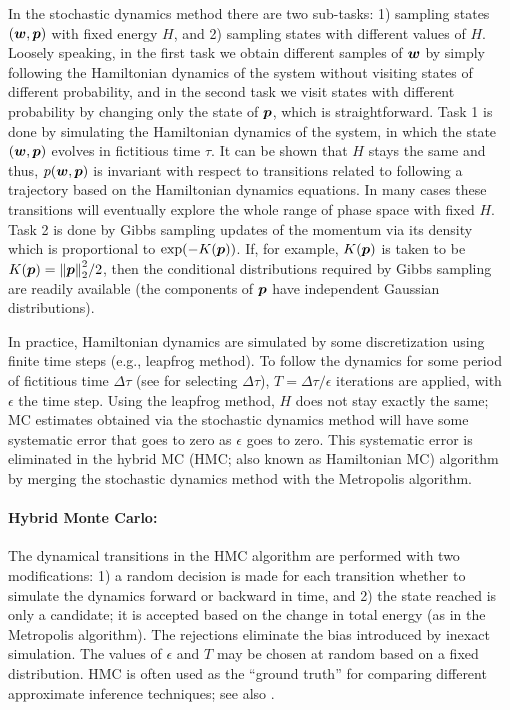In the stochastic dynamics method there are two sub-tasks: 1) sampling states $(\boldsymbol{w},\boldsymbol{p})$ with fixed energy $H$, and 2) sampling states with different values of $H$. 
Loosely speaking, in the first task we obtain different samples of $\boldsymbol{w}$ by simply following the Hamiltonian dynamics of the system without visiting states of different probability, and in the second task we visit states with different probability by changing only the state of $\boldsymbol{p}$, which is straightforward. 
Task 1 is done by simulating the Hamiltonian dynamics of the system, in which the state $(\boldsymbol{w},\boldsymbol{p})$ evolves in fictitious time $\tau$. 
It can be shown that $H$ stays the same and thus, $p(\boldsymbol{w},\boldsymbol{p})$ is invariant with respect to transitions related to following a trajectory based on the Hamiltonian dynamics equations. 
In many cases these transitions will eventually explore the whole range of phase space with fixed $H$.
Task 2 is done by Gibbs sampling updates of the momentum via its density which is proportional to $\exp(-K(\boldsymbol{p}))$. 
If, for example, $K(\boldsymbol{p})$ is taken to be $K(\boldsymbol{p}) = \norm{\boldsymbol{p}}_2^2/2$, then the conditional distributions required by Gibbs sampling are readily available (the components of $\boldsymbol{p}$ have independent Gaussian distributions). 

In practice, Hamiltonian dynamics are simulated by some discretization using finite time steps (e.g., leapfrog method). 
To follow the dynamics for some period of fictitious time $\Delta \tau$ (see \cite{neal1993probabilistic} for selecting $\Delta \tau$), $T = \Delta \tau/\epsilon$ iterations are applied, with $\epsilon$ the time step. 
Using the leapfrog method, $H$ does not stay exactly the same; MC estimates obtained via the stochastic dynamics method will have some systematic error that goes to zero as $\epsilon$ goes to zero. 
This systematic error is eliminated in the hybrid MC (HMC; also known as Hamiltonian MC) algorithm by merging the stochastic dynamics method with the Metropolis algorithm. 

\paragraph{Hybrid Monte Carlo:}\label{sec:hmc}
The dynamical transitions in the HMC algorithm are performed with two modifications: 1) a random decision is made for each transition whether to simulate the dynamics forward or backward in time, and 2) the state reached is only a candidate; it is accepted based on the change in total energy (as in the Metropolis algorithm).
The rejections eliminate the bias introduced by inexact simulation. 
The values of $\epsilon$ and $T$ may be chosen at random based on a fixed distribution.
HMC is often used as the ``ground truth'' for comparing different approximate inference techniques; see also \textcite{betancourt2017conceptual}. 

